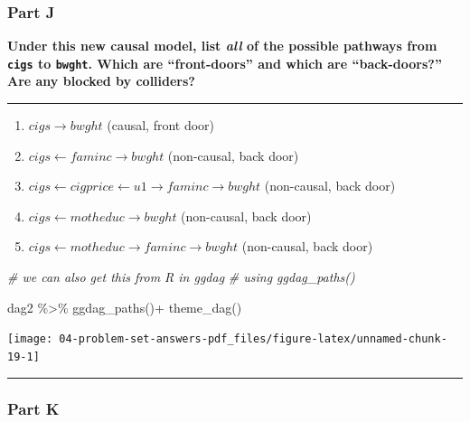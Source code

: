 \documentclass[
]{article}
\newenvironment{Shaded}{\begin{snugshade}}{\end{snugshade}}
\newcommand{\CommentTok}[1]{\textcolor[rgb]{0.56,0.35,0.01}{\textit{#1}}}
\newcommand{\FunctionTok}[1]{\textcolor[rgb]{0.00,0.00,0.00}{#1}}
\newcommand{\NormalTok}[1]{#1}
\newcommand{\SpecialCharTok}[1]{\textcolor[rgb]{0.00,0.00,0.00}{#1}}
\providecommand{\tightlist}{%
  \setlength{\itemsep}{0pt}\setlength{\parskip}{0pt}}
\begin{document}
\hypertarget{part-j}{%
\subsubsection{Part J}\label{part-j}}

\textbf{Under this new causal model, list \emph{all} of the possible
pathways from \texttt{cigs} to \texttt{bwght}. Which are ``front-doors''
and which are ``back-doors?'' Are any blocked by colliders?}

\begin{center}\rule{0.5\linewidth}{0.5pt}\end{center}

\begin{enumerate}
\def\labelenumi{\arabic{enumi}.}
\tightlist
\item
  \(cigs \rightarrow bwght\) (causal, front door)
\item
  \(cigs \leftarrow faminc \rightarrow bwght\) (non-causal, back door)
\item
  \(cigs \leftarrow cigprice \leftarrow u1 \rightarrow faminc \rightarrow bwght\)
  (non-causal, back door)
\item
  \(cigs \leftarrow motheduc \rightarrow bwght\) (non-causal, back door)
\item
  \(cigs \leftarrow motheduc \rightarrow faminc \rightarrow bwght\)
  (non-causal, back door)
\end{enumerate}

\begin{Shaded}
\begin{Highlighting}[]
\CommentTok{\# we can also get this from R in ggdag}
\CommentTok{\# using ggdag\_paths()}

\NormalTok{dag2 }\SpecialCharTok{\%\textgreater{}\%}
  \FunctionTok{ggdag\_paths}\NormalTok{()}\SpecialCharTok{+}
  \FunctionTok{theme\_dag}\NormalTok{()}
\end{Highlighting}
\end{Shaded}

\texttt{[image: 04-problem-set-answers-pdf\_files/figure-latex/unnamed-chunk-19-1]}

\begin{center}\rule{0.5\linewidth}{0.5pt}\end{center}

\hypertarget{part-k}{%
\subsubsection{Part K}\label{part-k}}
\end{document}
